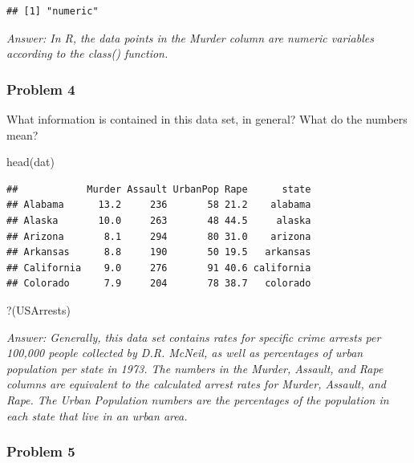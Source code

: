 \documentclass[
]{article}
\newenvironment{Shaded}{\begin{snugshade}}{\end{snugshade}}
\newcommand{\AttributeTok}[1]{\textcolor[rgb]{0.77,0.63,0.00}{#1}}
\newcommand{\FunctionTok}[1]{\textcolor[rgb]{0.00,0.00,0.00}{#1}}
\newcommand{\NormalTok}[1]{#1}
\newcommand{\StringTok}[1]{\textcolor[rgb]{0.31,0.60,0.02}{#1}}
\begin{document}
\begin{verbatim}
## [1] "numeric"
\end{verbatim}

\emph{Answer: In R, the data points in the Murder column are numeric
variables according to the class() function.}

\hypertarget{problem-4}{%
\subsubsection{Problem 4}\label{problem-4}}

What information is contained in this data set, in general? What do the
numbers mean?

\begin{Shaded}
\begin{Highlighting}[]
\FunctionTok{head}\NormalTok{(dat)}
\end{Highlighting}
\end{Shaded}

\begin{verbatim}
##            Murder Assault UrbanPop Rape      state
## Alabama      13.2     236       58 21.2    alabama
## Alaska       10.0     263       48 44.5     alaska
## Arizona       8.1     294       80 31.0    arizona
## Arkansas      8.8     190       50 19.5   arkansas
## California    9.0     276       91 40.6 california
## Colorado      7.9     204       78 38.7   colorado
\end{verbatim}

\begin{Shaded}
\begin{Highlighting}[]
\StringTok{\textasciigrave{}}\AttributeTok{?}\StringTok{\textasciigrave{}}\NormalTok{(USArrests)}
\end{Highlighting}
\end{Shaded}

\emph{Answer: Generally, this data set contains rates for specific crime
arrests per 100,000 people collected by D.R. McNeil, as well as
percentages of urban population per state in 1973. The numbers in the
Murder, Assault, and Rape columns are equivalent to the calculated
arrest rates for Murder, Assault, and Rape. The Urban Population numbers
are the percentages of the population in each state that live in an
urban area.}

\hypertarget{problem-5}{%
\subsubsection{Problem 5}\label{problem-5}}
\end{document}
